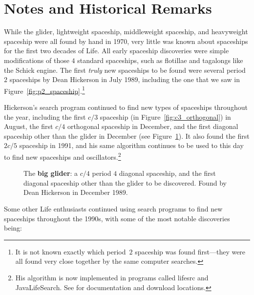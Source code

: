 \section{Notes and Historical Remarks}\label{sec:spaceships_notes}

While the glider, lightweight spaceship, middleweight spaceship, and heavyweight spaceship were all found by hand in 1970, very little was known about spaceships for the first two decades of Life. All early spaceship discoveries were simple modifications of those $4$ standard spaceships, such as flotillae and tagalongs like the Schick engine. The first \emph{truly} new spaceships to be found were several period~$2$ spaceships by Dean Hickerson in July 1989, including the one that we saw in Figure~\ref{fig:p2_spaceship}.\footnote{It is not known exactly which period~$2$ spaceship was found first---they were all found very close together by the same computer searches.}

Hickerson's search program continued to find new types of spaceships throughout the year, including the first $c/3$ spaceship (in Figure~\ref{fig:c3_orthogonal}) in August, the first $c/4$ orthogonal spaceship in December, and the first diagonal spaceship other than the glider in December (see Figure~\ref{fig:big_glider}). It also found the first $2c/5$ spaceship in 1991, and his same algorithm continues to be used to this day to find new spaceships and oscillators.\footnote{His algorithm is now implemented in programs called lifesrc and JavaLifeSearch. See  for documentation and download locations.}

\begin{figure}[!htb]
	\centering
	\caption{The \textbf{big glider}: a $c/4$ period $4$ diagonal spaceship, and the first diagonal spaceship other than the glider to be discovered. Found by Dean Hickerson in December 1989.}
	\label{fig:big_glider}
\end{figure}

Some other Life enthusiasts continued using search programs to find new spaceships throughout the 1990s, with some of the most notable discoveries being:\smallskip

